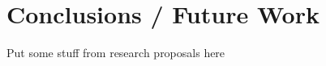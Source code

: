 \chapter{Conclusions / Future Work}\label{ch:conclusions} 


Put some stuff from research proposals here 